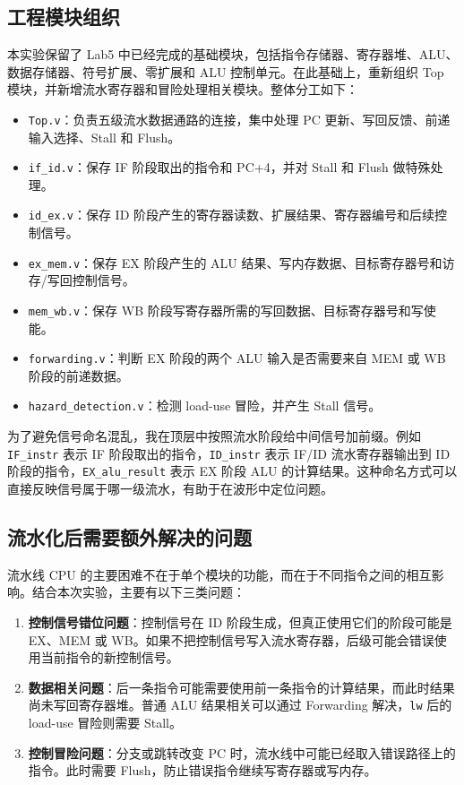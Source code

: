 \documentclass[UTF8,zihao=-4]{ctexart}
\begin{document}
\subsection{工程模块组织}

本实验保留了 Lab5 中已经完成的基础模块，包括指令存储器、寄存器堆、ALU、数据存储器、符号扩展、零扩展和 ALU 控制单元。在此基础上，重新组织 Top 模块，并新增流水寄存器和冒险处理相关模块。整体分工如下：

\begin{itemize}
  \item \texttt{Top.v}：负责五级流水数据通路的连接，集中处理 PC 更新、写回反馈、前递输入选择、Stall 和 Flush。
  \item \texttt{if\_id.v}：保存 IF 阶段取出的指令和 PC+4，并对 Stall 和 Flush 做特殊处理。
  \item \texttt{id\_ex.v}：保存 ID 阶段产生的寄存器读数、扩展结果、寄存器编号和后续控制信号。
  \item \texttt{ex\_mem.v}：保存 EX 阶段产生的 ALU 结果、写内存数据、目标寄存器号和访存/写回控制信号。
  \item \texttt{mem\_wb.v}：保存 WB 阶段写寄存器所需的写回数据、目标寄存器号和写使能。
  \item \texttt{forwarding.v}：判断 EX 阶段的两个 ALU 输入是否需要来自 MEM 或 WB 阶段的前递数据。
  \item \texttt{hazard\_detection.v}：检测 load-use 冒险，并产生 Stall 信号。
\end{itemize}

为了避免信号命名混乱，我在顶层中按照流水阶段给中间信号加前缀。例如 \texttt{IF\_instr} 表示 IF 阶段取出的指令，\texttt{ID\_instr} 表示 IF/ID 流水寄存器输出到 ID 阶段的指令，\texttt{EX\_alu\_result} 表示 EX 阶段 ALU 的计算结果。这种命名方式可以直接反映信号属于哪一级流水，有助于在波形中定位问题。

\subsection{流水化后需要额外解决的问题}

流水线 CPU 的主要困难不在于单个模块的功能，而在于不同指令之间的相互影响。结合本次实验，主要有以下三类问题：

\begin{enumerate}[label=\arabic*.]
  \item \textbf{控制信号错位问题}：控制信号在 ID 阶段生成，但真正使用它们的阶段可能是 EX、MEM 或 WB。如果不把控制信号写入流水寄存器，后级可能会错误使用当前指令的新控制信号。
  \item \textbf{数据相关问题}：后一条指令可能需要使用前一条指令的计算结果，而此时结果尚未写回寄存器堆。普通 ALU 结果相关可以通过 Forwarding 解决，\texttt{lw} 后的 load-use 冒险则需要 Stall。
  \item \textbf{控制冒险问题}：分支或跳转改变 PC 时，流水线中可能已经取入错误路径上的指令。此时需要 Flush，防止错误指令继续写寄存器或写内存。
\end{enumerate}
\end{document}
